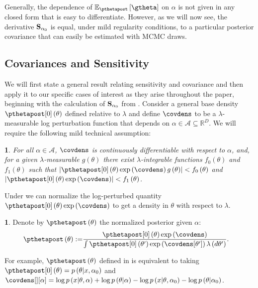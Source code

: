 \documentclass{article}\usepackage[]{graphicx}\usepackage[]{color}
\theoremstyle{definition}
\newtheorem{defn}{\protect\definitionname}
\theoremstyle{plain}
\newtheorem{assumption}{\protect\assumptionname}
\theoremstyle{plain}
\theoremstyle{plain}
\theoremstyle{definition}
\theoremstyle{plain}
\theoremstyle{plain}
\providecommand{\assumptionname}{Assumption}
\providecommand{\definitionname}{Definition}
\begin{document}
Generally, the dependence of $\epgtheta$ on $\alpha$ is not given in any
closed form that is easy to differentiate.  However, as we will now see,
the derivative $\mathbf{S}_{\alpha_{0}}$ is equal, under mild regularity conditions, to
a particular posterior covariance that can easily be estimated with MCMC draws.





\subsection{Covariances and Sensitivity\label{subsec:cov_and_sens}}

We will first state a general result relating sensitivity and covariance and
then apply it to our specific cases of interest as they arise throughout the
paper, beginning with the calculation of $\mathbf{S}_{\alpha_{0}}$ from
. Consider a general base density
$\pzeropost\left(\theta\right)$ defined relative to $\lambda$ and define
$\covdens$ to be a $\lambda$-measurable log perturbation function that depends
on $\alpha\in\mathcal{A}\subseteq\mathbb{R}^{D}$.
We will require the following mild technical assumption:
\begin{assumption}
\label{assu:exchange_order}
For all $\alpha\in\mathcal{A}$, $\covdens$ is continuously differentiable
with respect to $\alpha$, and, for a given $\lambda$-measurable
$g\left(\theta\right)$ there exist $\lambda$-integrable functions
$f_{0}\left(\theta\right)$ and $f_{1}\left(\theta\right)$ such that
$\left|\pzeropost\left(\theta\right)\exp\left(\covdens\right)
g\left(\theta\right)\right|<f_{0}\left(\theta\right)$
and
$\left|\pzeropost\left(\theta\right)\exp\left(\covdens\right)\right|<f_{1}\left(\theta\right)$.
\end{assumption}
Under  we can normalize the log-perturbed
quantity $\pzeropost\left(\theta\right) \exp\left(\covdens\right)$ to get
a density in $\theta$ with respect to $\lambda$.
\begin{defn}\label{def:pthetapost}
Denote by $\pthetapost\left(\theta\right)$ the normalized posterior
given $\alpha$:
\begin{align}
\pthetapost\left(\theta\right) := &
            \frac{\pzeropost\left(\theta\right)\exp\left(\covdens\right)}
            {\int \pzeropost\left(\theta'\right)\exp\left(\covdens[\theta']\right)
            \lambda\left(d\theta'\right)}.\label{eq:tilting_definition}
\end{align}
\end{defn}
For example,
$\pthetapost\left(\theta\right)$ defined in
 is equivalent to taking
$\pzeropost\left(\theta\right) = p\left(\theta \vert x, \alpha_0\right)$
and $\covdens[][\alpha] =\log p\left(x\vert\theta,\alpha\right) +
    \log p\left(\theta\vert\alpha\right)-\log p\left(x\vert\theta,\alpha_{0}\right) -
    \log p\left(\theta\vert\alpha_{0}\right)$.
\end{document}
